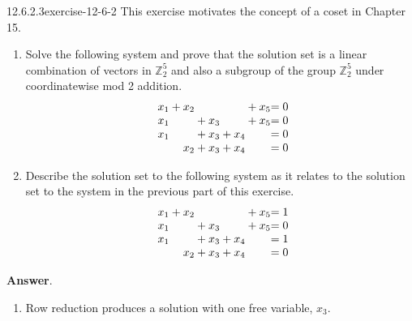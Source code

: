 \documentclass[twoside,10pt,]{book}
\numberwithin{equation}{section}
\begin{document}
\begin{divisionsolution}{12.6.2.3}{}{exercise-12-6-2}%
\hypertarget{p-4746}{}%
This exercise motivates the concept of a coset in Chapter 15.\leavevmode%
\begin{enumerate}[label=(\alph*)]
\item\hypertarget{li-2163}{}\hypertarget{p-4747}{}%
Solve the following system and prove that the solution set is a linear combination of vectors in \(\mathbb{Z}_{2}^{5}\)  and also a subgroup of the group \(\mathbb{Z}_{2}^{5}\) under coordinatewise mod 2 addition.%
\begin{equation*}
\begin{array}{r@{}r@{}r@{}r@{}r@{}r@{}r@{}r@{}r@{}r@{}}
x_1 & {}+{} &x_2 &       &    &     &     &{}+{} & x_5&= 0 \\
x_1 &       &    & {}+{} &x_3 &      &     &{}+{} & x_5&= 0 \\
x_1 &       &    & {}+{} &x_3 &{}+{} & x_4 &      &    &= 0 \\
&       & x_2   & {}+{} &x_3 &{}+{} & x_4 &      &    &= 0 \\
\end{array}
\end{equation*}
%
\item\hypertarget{li-2164}{}\hypertarget{p-4748}{}%
Describe the solution set to the following system as it relates to the solution set to the system in the previous part of this exercise.%
\begin{equation*}
\begin{array}{r@{}r@{}r@{}r@{}r@{}r@{}r@{}r@{}r@{}r@{}}
x_1 & {}+{} &x_2 &       &    &     &     &{}+{} & x_5&= 1 \\
x_1 &       &    & {}+{} &x_3 &      &     &{}+{} & x_5&= 0 \\
x_1 &       &    & {}+{} &x_3 &{}+{} & x_4 &      &    &= 1 \\
&       & x_2   & {}+{} &x_3 &{}+{} & x_4 &      &    &= 0 \\
\end{array}
\end{equation*}
%
\end{enumerate}
%
\par\smallskip%
\noindent\textbf{Answer}.\quad%
\hypertarget{p-4749}{}%
\leavevmode%
\begin{enumerate}[label=(\alph*)]
\item\hypertarget{li-2165}{}\hypertarget{p-4750}{}%
Row reduction produces a solution with one free variable, \(x_3\).%
\begin{equation*}

\end{equation*}
\end{enumerate}
\end{divisionsolution}
\end{document}
